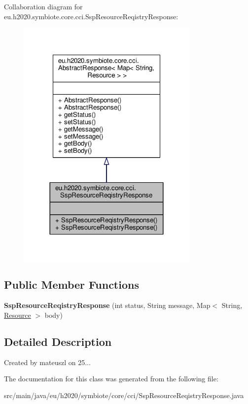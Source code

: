 Collaboration diagram for eu.\+h2020.\+symbiote.\+core.\+cci.\+Ssp\+Resource\+Reqistry\+Response\+:
\nopagebreak
\begin{figure}[H]
\begin{center}
\leavevmode
\includegraphics[width=252pt]{classeu_1_1h2020_1_1symbiote_1_1core_1_1cci_1_1SspResourceReqistryResponse__coll__graph}
\end{center}
\end{figure}
\subsection*{Public Member Functions}
\begin{DoxyCompactItemize}
\item 
\mbox{\label{classeu_1_1h2020_1_1symbiote_1_1core_1_1cci_1_1SspResourceReqistryResponse_a4f06b4373c0c8ff34fc567f2e1d1455f}} 
{\bfseries Ssp\+Resource\+Reqistry\+Response} (int status, String message, Map$<$ String, \hyperlink{classeu_1_1h2020_1_1symbiote_1_1model_1_1cim_1_1Resource}{Resource} $>$ body)
\end{DoxyCompactItemize}


\subsection{Detailed Description}
Created by mateuszl on 25... 

The documentation for this class was generated from the following file\+:\begin{DoxyCompactItemize}
\item 
src/main/java/eu/h2020/symbiote/core/cci/Ssp\+Resource\+Reqistry\+Response.\+java\end{DoxyCompactItemize}
